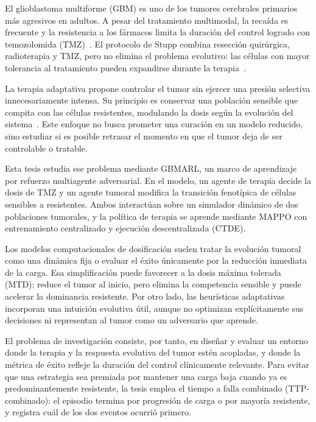 

El glioblastoma multiforme (GBM) es uno de los tumores cerebrales primarios más agresivos en adultos. A pesar del tratamiento multimodal, la recaída es frecuente y la resistencia a los fármacos limita la duración del control logrado con temozolomida (TMZ)~\cite{Tan2020,Sipos2025,Adegboyega2021}. El protocolo de Stupp combina resección quirúrgica, radioterapia y TMZ, pero no elimina el problema evolutivo: las células con mayor tolerancia al tratamiento pueden expandirse durante la terapia~\cite{Stupp2005,Jezierzanski2024}.

La terapia adaptativa propone controlar el tumor sin ejercer una presión selectiva innecesariamente intensa. Su principio es conservar una población sensible que compita con las células resistentes, modulando la dosis según la evolución del sistema~\cite{Gatenby2022,Gallaher2017,Strobl2020}. Este enfoque no busca prometer una curación en un modelo reducido, sino estudiar si es posible retrasar el momento en que el tumor deja de ser controlable o tratable.

Esta tesis estudia ese problema mediante GBMARL, un marco de aprendizaje por refuerzo multiagente adversarial. En el modelo, un agente de terapia decide la dosis de TMZ y un agente tumoral modifica la transición fenotípica de células sensibles a resistentes. Ambos interactúan sobre un simulador dinámico de dos poblaciones tumorales, y la política de terapia se aprende mediante MAPPO con entrenamiento centralizado y ejecución descentralizada (CTDE).


Los modelos computacionales de dosificación suelen tratar la evolución tumoral como una dinámica fija o evaluar el éxito únicamente por la reducción inmediata de la carga. Esa simplificación puede favorecer a la dosis máxima tolerada (MTD): reduce el tumor al inicio, pero elimina la competencia sensible y puede acelerar la dominancia resistente. Por otro lado, las heurísticas adaptativas incorporan una intuición evolutiva útil, aunque no optimizan explícitamente sus decisiones ni representan al tumor como un adversario que aprende.

El problema de investigación consiste, por tanto, en diseñar y evaluar un entorno donde la terapia y la respuesta evolutiva del tumor estén acopladas, y donde la métrica de éxito refleje la duración del control clínicamente relevante. Para evitar que una estrategia sea premiada por mantener una carga baja cuando ya es predominantemente resistente, la tesis emplea el tiempo a falla combinado (TTP-combinado): el episodio termina por progresión de carga o por mayoría resistente, y registra cuál de los dos eventos ocurrió primero.

